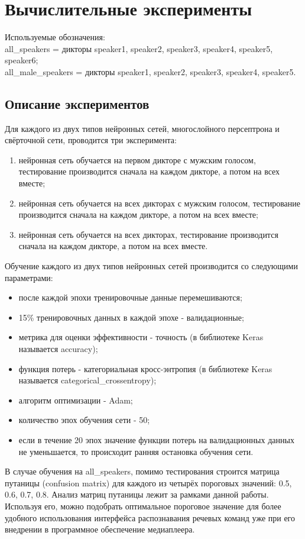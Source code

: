 \section{Вычислительные эксперименты}
Используемые обозначения: \\
all\_speakers = дикторы speaker1, speaker2, speaker3, speaker4, speaker5, speaker6; \\
all\_male\_speakers = дикторы speaker1, speaker2, speaker3, speaker4, speaker5.
\subsection{Описание экспериментов}
Для каждого из двух типов нейронных сетей, многослойного персептрона и свёрточной сети, проводится три эксперимента:
\begin{enumerate}[leftmargin=2cm]
	\item нейронная сеть обучается на первом дикторе с мужским голосом, тестирование производится сначала на каждом дикторе, а потом на всех вместе;
	\item нейронная сеть обучается на всех дикторах с мужским голосом, тестирование производится сначала на каждом дикторе, а потом на всех вместе;
	\item нейронная сеть обучается на всех дикторах, тестирование производится сначала на каждом дикторе, а потом на всех вместе.
\end{enumerate}

Обучение каждого из двух типов нейронных сетей производится со следующими параметрами:
\begin{itemize}[leftmargin=2cm]
	\item после каждой эпохи тренировочные данные перемешиваются;
	\item 15\% тренировочных данных в каждой эпохе - валидационные;
	\item метрика для оценки эффективности - точность (в библиотеке Keras называется accuracy);
	\item функция потерь - категориальная кросс-энтропия (в библиотеке Keras называется categorical\_crossentropy);
	\item алгоритм оптимизации - Adam;
	\item количество эпох обучения сети - 50;
	\item если в течение 20 эпох значение функции потерь на валидационных данных не уменьшается, то происходит ранняя остановка обучения сети.
\end{itemize}

В случае обучения на all\_speakers, помимо тестирования строится матрица путаницы (confusion matrix) для каждого из четырёх пороговых значений: 0.5, 0.6, 0.7, 0.8. Анализ матриц путаницы лежит за рамками данной работы. Используя его, можно подобрать оптимальное пороговое значение для более удобного использования интерфейса распознавания речевых команд уже при его внедрении в программное обеспечение медиаплеера. 

